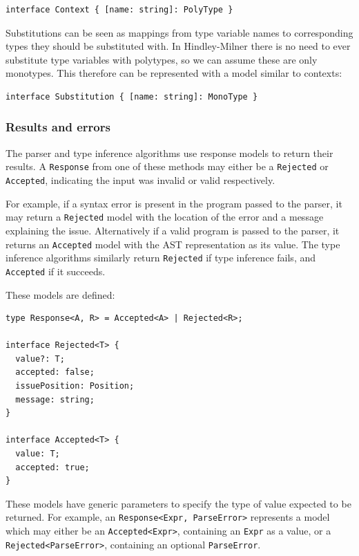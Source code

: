 \documentclass[a4paper,fleqn,oneside,12pt]{report}
\begin{document}
\begin{verbatim}
interface Context { [name: string]: PolyType }
\end{verbatim}
Substitutions can be seen as mappings from type variable names to corresponding types they should be substituted with. In Hindley-Milner there is no need to ever substitute type variables with polytypes, so we can assume these are only monotypes. This therefore can be represented with a model similar to contexts:

\begin{verbatim}
interface Substitution { [name: string]: MonoType }
\end{verbatim}

\subsubsection{Results and errors}\label{id:h.5yk2zijb0axq}

The parser and type inference algorithms use response models to return their results. A \texttt{Response} from one of these methods may either be a \texttt{Rejected} or \texttt{Accepted}, indicating the input was invalid or valid respectively.

For example, if a syntax error is present in the program passed to the parser, it may return a \texttt{Rejected} model with the location of the error and a message explaining the issue. Alternatively if a valid program is passed to the parser, it returns an \texttt{Accepted} model with the AST representation as its value. The type inference algorithms similarly return \texttt{Rejected} if type inference fails, and \texttt{Accepted} if it succeeds.

These models are defined:

\begin{verbatim}
type Response<A, R> = Accepted<A> | Rejected<R>;

interface Rejected<T> {
  value?: T;
  accepted: false;
  issuePosition: Position;
  message: string;
}

interface Accepted<T> {
  value: T;
  accepted: true;
}
\end{verbatim}

These models have generic parameters to specify the type of value expected to be returned. For example, an \texttt{Response<Expr, ParseError>} represents a model which may either be an \texttt{Accepted<Expr>}, containing an \texttt{Expr} as a value, or a \texttt{Rejected<ParseError>}, containing an optional \texttt{ParseError}.
\end{document}
